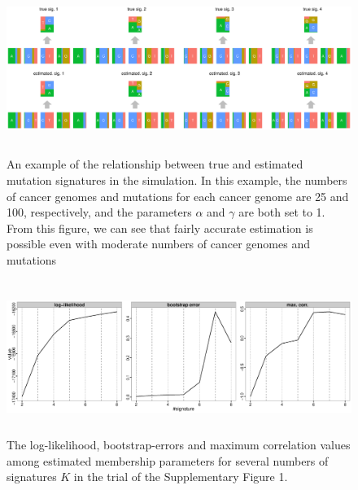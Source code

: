 \documentclass{article}
\begin{document}
\clearpage


\begin{figure}
\centering
\includegraphics[width=15cm,height=5.5cm]{simulation_signature_example.eps}
\caption{An example of the relationship between true and estimated mutation signatures in the simulation.
In this example, the numbers of cancer genomes and mutations for each cancer genome are 25 and 100, respectively,
and the parameters $\alpha$ and $\gamma$ are both set to 1. 
From this figure, we can see that fairly accurate estimation is possible even with moderate numbers of cancer genomes and mutations}
\label{example_signature.pd}
\end{figure}


\clearpage

\begin{figure}
\centering
\includegraphics[width=15cm,height=5cm]{simulation_stat.eps}
\caption{The log-likelihood, bootstrap-errors and maximum correlation values among estimated membership parameters for several numbers of signatures $K$ in the trial of the Supplementary Figure 1.}
\label{example_summary.pd}
\end{figure}

\clearpage
\end{document}
